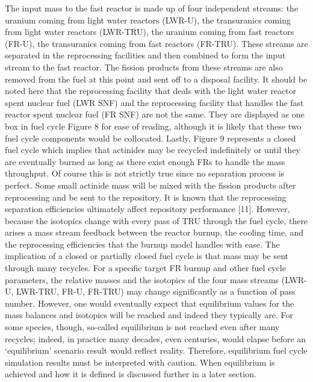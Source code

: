 The input mass to the fast reactor is made up of four independent streams: the uranium coming from light water reactors (LWR-U), the transuranics coming from light water reactors (LWR-TRU), the uranium coming from fast reactors (FR-U), the transuranics coming from fast reactors (FR-TRU).  These streams are separated in the reprocessing facilities and then combined to form the input stream to the fast reactor.  The fission products from these streams are also removed from the fuel at this point and sent off to a disposal facility.  
It should be noted here that the reprocessing facility that deals with the light water reactor spent nuclear fuel (LWR SNF) and the reprocessing facility that handles the fast reactor spent nuclear fuel (FR SNF) are not the same.  They are displayed as one box in fuel cycle Figure 8 for ease of reading, although it is likely that these two fuel cycle components would be collocated.
Lastly, Figure 9 represents a closed fuel cycle which implies that actinides may be recycled indefinitely or until they are eventually burned as long as there exist enough FRs to handle the mass throughput.  Of course this is not strictly true since no separation process is perfect.  Some small actinide mass will be mixed with the fission products after reprocessing and be sent to the repository.  It is known that the reprocessing separation efficiencies ultimately affect repository performance [11].  However, because the isotopics change with every pass of TRU through the fuel cycle, there arises a mass stream feedback between the reactor burnup, the cooling time, and the reprocessing efficiencies that the burnup model handles with ease. 
The implication of a closed or partially closed fuel cycle is that mass may be sent through many recycles.  For a specific target FR burnup and other fuel cycle parameters, the relative masses and the isotopics of the four mass streams (LWR-U, LWR-TRU, FR-U, FR-TRU) may change significantly as a function of pass number.  However, one would eventually expect that equilibrium values for the mass balances and isotopics will be reached and indeed they typically are.  For some species, though, so-called equilibrium is not reached even after many recycles; indeed, in practice many decades, even centuries, would elapse before an ‘equilibrium’ scenario result would reflect reality.  Therefore, equilibrium fuel cycle simulation results must be interpreted with caution.  When equilibrium is achieved and how it is defined is discussed further in a later section.  



